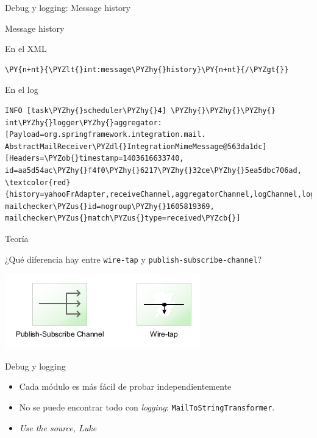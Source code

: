 \documentclass{beamer}
\begin{document}
\begin{frame}[fragile]{Debug y logging: Message history}
\begin{center}
Message history
\end{center}
En el XML
\begin{Verbatim}[fontsize=\tiny,commandchars=\\\{\}]
\PY{n+nt}{\PYZlt{}int:message\PYZhy{}history}\PY{n+nt}{/\PYZgt{}}
\end{Verbatim}

En el log
\begin{Verbatim}[fontsize=\tiny,commandchars=\\\{\}]
INFO [task\PYZhy{}scheduler\PYZhy{}4] \PYZhy{}\PYZhy{}\PYZhy{} int\PYZhy{}logger\PYZhy{}aggregator: [Payload=org.springframework.integration.mail.
AbstractMailReceiver\PYZdl{}IntegrationMimeMessage@563da1dc][Headers=\PYZob{}timestamp=1403616633740, id=aa5d54ac\PYZhy{}f4f0\PYZhy{}6217\PYZhy{}32ce\PYZhy{}5ea5dbc706ad,
\textcolor{red}{history=yahooFrAdapter,receiveChannel,aggregatorChannel,logChannel,logChannel.adapter},
mailchecker\PYZus{}id=nogroup\PYZhy{}1605819369, mailchecker\PYZus{}match\PYZus{}type=received\PYZcb{}]
\end{Verbatim}
\end{frame}

\begin{frame}[fragile]{Teoría}
\begin{center}
¿Qué diferencia hay entre \verb|wire-tap| y \verb|publish-subscribe-channel|?
\end{center}
\begin{center}
\includegraphics[width=0.5\linewidth]{sp-int-20}
\end{center}
\end{frame}

\begin{frame}[fragile]{Debug y logging}
\begin{itemize}[<+->]
\item Cada módulo es más fácil de probar independientemente 
\item No se puede encontrar todo con \textit{logging}: \verb|MailToStringTransformer|.
\item \textit{Use the source, Luke} 
\end{itemize}
\end{frame}
\end{document}
